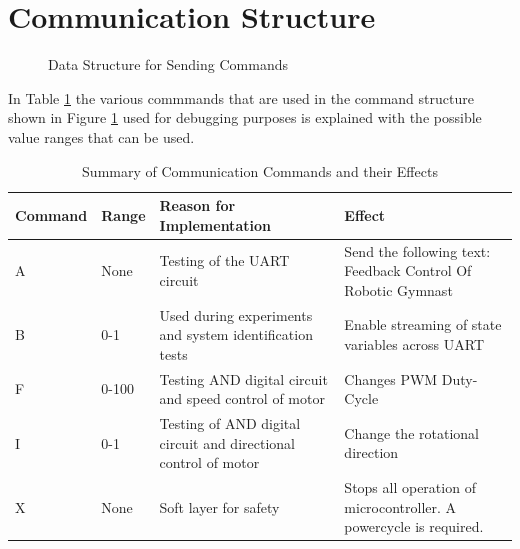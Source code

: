 



\section{Communication Structure}
\label{sec:software_requirements}
\begin{figure}[h]
	\centering
	
	\caption{Data Structure for Sending Commands}
	\label{fig:uart_struct_app}
\end{figure}

In Table \ref{table:uart_commands} the various commmands that are used in the command structure shown in Figure \ref{fig:uart_struct_app} used for debugging purposes is explained with the possible value ranges that can be used.


\begin{table}[h]
	\centering
	\begin{tabular}{|p{2cm}|p{1cm}|p{5cm}|p{5cm}|}
		\hline
		Command & Range &  Reason for Implementation & Effect \\
		\hline
		\hline
		A & None & Testing of the UART circuit & Send the following text: Feedback Control Of Robotic Gymnast\\
		\hline
		B & 0-1 & Used during experiments and system identification tests& Enable streaming of state variables across UART \\ 
		\hline
		F & 0-100 &  Testing AND digital circuit and speed control of motor& Changes PWM Duty-Cycle \\
		\hline
		I & 0-1 & Testing of AND digital circuit and directional control of motor & Change the rotational direction \\
		\hline
		X & None & Soft layer for safety & Stops all operation of microcontroller. A powercycle is required.   \\
		\hline
	
	\end{tabular}
	\caption{Summary of Communication Commands and their Effects}
	\label{table:uart_commands}

\end{table}


\newpage


%







\endinput
